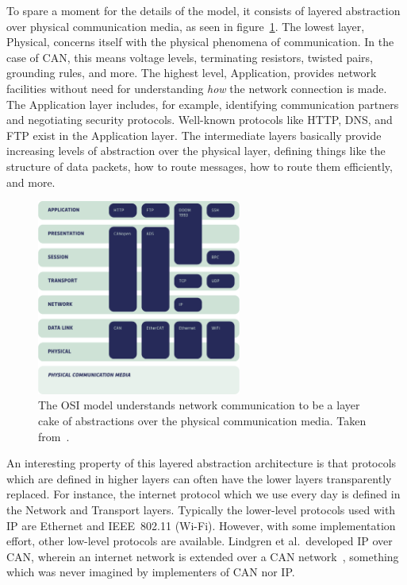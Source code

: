 \documentclass[english,12pt,a4paper,pdftex,eng,utf8]{aaltothesis}
\begin{document}
To spare a moment for the details of the model, it consists of layered abstraction over physical communication media, as seen in figure~\ref{fig:osi_model}.  The lowest layer, Physical, concerns itself with the physical phenomena of communication.  In the case of CAN, this means voltage levels, terminating resistors, twisted pairs, grounding rules, and more.  The highest level, Application, provides network facilities without need for understanding {\it how\/} the network connection is made.  The Application layer includes, for example, identifying communication partners and negotiating security protocols.  Well-known protocols like HTTP, DNS, and FTP exist in the Application layer.  The intermediate layers basically provide increasing levels of abstraction over the physical layer, defining things like the structure of data packets, how to route messages, how to route them efficiently, and more.

\begin{figure}[h]
  \centering
  \includegraphics[width=0.6\textwidth]{assets/osi_model}
  \caption{The OSI model understands network communication to be a layer cake of abstractions over the physical communication media.  Taken from~\cite[§6.1.3]{ISO7498-1}.}\label{fig:osi_model}
\end{figure}

An interesting property of this layered abstraction architecture is that protocols which are defined in higher layers can often have the lower layers transparently replaced.  For instance, the internet protocol which we use every day is defined in the Network and Transport layers.  Typically the lower-level protocols used with IP are Ethernet and IEEE~802.11 (Wi-Fi).  However, with some implementation effort, other low-level protocols are available.  Lindgren et al.\ developed IP over CAN, wherein an internet network is extended over a CAN network~\cite{Lindgren2008}, something which was never imagined by implementers of CAN nor IP.\
\end{document}
